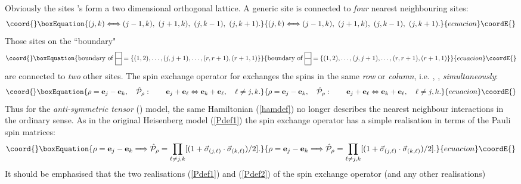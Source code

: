 \documentclass[a4paper,12pt]{article}
\def\twosqr#1#2{{\vcenter{\hrule height.#2pt
      \hbox{\vrule width.#2pt height#1pt \kern#1pt
          \vrule width.#2pt}
      \hrule height.#2pt
      \hbox{\vrule width.#2pt height#1pt \kern#1pt
          \vrule width.#2pt}
      \hrule height.#2pt}}}
\begin{document}
Obviously the sites \coordHE{}'s form a two dimensional orthogonal lattice.
A generic site \coordHE{} is connected to {\em four\/} nearest neighbouring
sites:
\begin{equation}\coord{}\boxEquation{
(j,k) \Longleftrightarrow (j-1,k),\ (j+1,k),\ (j,k-1),\ (j,k+1).
}{
(j,k) \Longleftrightarrow (j-1,k),\ (j+1,k),\ (j,k-1),\ (j,k+1).
}{ecuacion}\coordE{}\end{equation}
Those sites on the ``boundary"
\begin{equation}\coord{}\boxEquation{
\mbox{boundary of}\ {\twosqr{9}5}=
\{(1,2),\ldots,(j,j+1),\ldots,(r,r+1),(r+1,1)\}
}{
\mbox{boundary of}\ {\twosqr{9}5}=
\{(1,2),\ldots,(j,j+1),\ldots,(r,r+1),(r+1,1)\}
}{ecuacion}\coordE{}\end{equation}
are connected to {\em two\/} other sites.
The spin exchange operator \coordHE{} for
\coordHE{} exchanges the spins in
the same {\em row\/} or {\em
column\/}, i.e.
\coordHE{}, \coordHE{}, {\em
simultaneously\/}:
\begin{equation}\coord{}\boxEquation{
\rho={\bf e}_j-{\bf e}_k,\quad \hat{\cal P}_\rho:\qquad
{\bf e}_j+{\bf e}_\ell\Leftrightarrow
{\bf e}_k+{\bf e}_\ell,\quad \ell\neq j,k.
}{
\rho={\bf e}_j-{\bf e}_k,\quad \hat{\cal P}_\rho:\qquad
{\bf e}_j+{\bf e}_\ell\Leftrightarrow
{\bf e}_k+{\bf e}_\ell,\quad \ell\neq j,k.
}{ecuacion}\coordE{}\end{equation}
Thus for the {\em anti-symmetric tensor\/} (\coordHE{}) model, the
same Hamiltonian (\ref{hamdef}) no longer describes the nearest neighbour
interactions in the ordinary sense. As in the original Heisenberg model
(\ref{Pdef1})  the spin exchange operator has a
simple realisation in terms of the
Pauli spin matrices:
\begin{equation}\coord{}\boxEquation{
\rho={\bf e}_j-{\bf e}_k\Longrightarrow
\hat{\cal P}_\rho=\prod_{\ell\neq
j,k}[(1+\vec{\sigma}_{(j,\ell)}\cdot\vec{\sigma}_{(k,\ell)})/2].
\label{Pdef2}
}{
\rho={\bf e}_j-{\bf e}_k\Longrightarrow
\hat{\cal P}_\rho=\prod_{\ell\neq
j,k}[(1+\vec{\sigma}_{(j,\ell)}\cdot\vec{\sigma}_{(k,\ell)})/2].
}{ecuacion}\coordE{}\end{equation}
It should be emphasised that the two realisations
(\ref{Pdef1}) and (\ref{Pdef2}) of
the  spin exchange operator \coordHE{} (and any other realisations)
\end{document}
